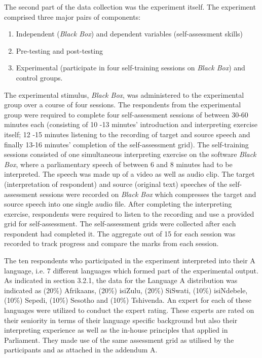 \documentclass[output=paper]{langsci/langscibook}
\begin{document}
The second part of the data collection was the experiment itself. The experiment comprised three major pairs of components: 

\begin{enumerate}
\item Independent (\textit{Black Box}) and dependent variables (self-assessment skills) 
\item Pre-testing and post-testing 
\item Experimental (participate in four self-training sessions on \textit{Black Box}) and control groups. 
\end{enumerate}

The experimental stimulus, \textit{Black Box}, was administered to the experimental group over a course of four sessions. The respondents from the experimental group were required to complete four self-assessment sessions of between 30-60 minutes each (consisting of 10 -13 minutes’ introduction and interpreting exercise itself; 12 -15 minutes listening to the recording of target and source speech and finally 13-16 minutes’ completion of the self-assessment grid). The self-training sessions consisted of one simultaneous interpreting exercise on the software \textit{Black Box}, where a parliamentary speech of between 6 and 8 minutes had to be interpreted. The speech was made up of a video as well as audio clip. The target (interpretation of respondent) and source (original text) speeches of the self-assessment sessions were recorded on \textit{Black Box} which compresses the target and source speech into one single audio file. After completing the interpreting exercise, respondents were required to listen to the recording and use a provided grid for self-assessment. The self-assessment grids were collected after each respondent had completed it. The aggregate out of 15 for each session was recorded to track progress and compare the marks from each session. 


The ten respondents who participated in the experiment interpreted into their A language, i.e. 7 different languages which formed part of the experimental output. As indicated in section 3.2.1, the data for the Language A distribution was indicated as (20\%) Afrikaans, (20\%) isiZulu, (20\%) SiSwati, (10\%) isiNdebele, (10\%) Sepedi, (10\%) Sesotho and (10\%) Tshivenda. An expert for each of these languages were utilized to conduct the expert rating. These experts are rated on their seniority in terms of their language specific background but also their interpreting experience as well as the in-house principles that applied in Parliament. They made use of the same assessment grid as utilised by the participants and as attached in the addendum A.
\end{document}
